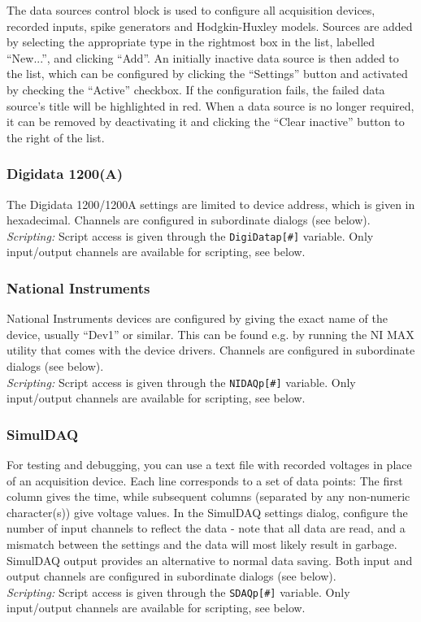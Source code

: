 \documentclass{article}
\begin{document}
The data sources control block is used to configure all acquisition devices,
recorded inputs, spike generators and Hodgkin-Huxley models. Sources are added
by selecting the appropriate type in the rightmost box in the list, labelled
``New...'', and clicking ``Add''. An initially inactive data source is then added
to the list, which can be configured by clicking the ``Settings'' button and
activated by checking the ``Active'' checkbox. If the configuration fails, the
failed data source's title will be highlighted in red. When a data source is no
longer required, it can be removed by deactivating it and clicking the
``Clear inactive'' button to the right of the list.

\subsubsection{Digidata 1200(A)}
The Digidata 1200/1200A settings are limited to device address, which is given
in hexadecimal. Channels are configured in subordinate dialogs (see below).
\\
\emph{Scripting:} Script access is given through the \texttt{DigiDatap[\#]} variable.
Only input/output channels are available for scripting, see below.

\subsubsection{National Instruments}
National Instruments devices are configured by giving the exact name of the device,
usually ``Dev1'' or similar. This can be found e.g. by running the NI MAX utility
that comes with the device drivers. Channels are configured in subordinate dialogs (see below).
\\
\emph{Scripting:} Script access is given through the \texttt{NIDAQp[\#]} variable.
Only input/output channels are available for scripting, see below.

\subsubsection{SimulDAQ}
For testing and debugging, you can use a text file with recorded voltages in place of
an acquisition device. Each line corresponds to a set of data points: The first column
gives the time, while subsequent columns (separated by any non-numeric character(s)) give
voltage values. In the SimulDAQ settings dialog, configure the number of input channels
to reflect the data - note that all data are read, and a mismatch between the settings and
the data will most likely result in garbage. SimulDAQ output provides an alternative to
normal data saving. Both input and output channels are configured in subordinate dialogs (see below).
\\
\emph{Scripting:} Script access is given through the \texttt{SDAQp[\#]} variable.
Only input/output channels are available for scripting, see below.
\end{document}
